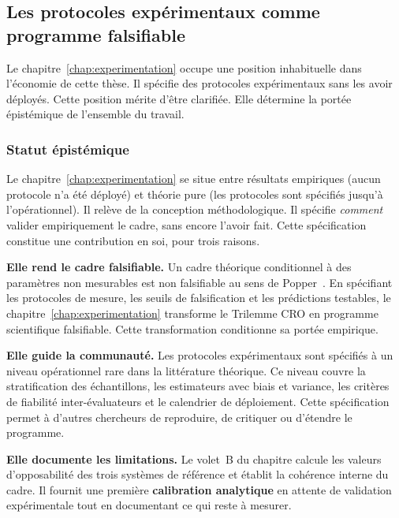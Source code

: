 \subsection{Les protocoles exp\'erimentaux comme programme falsifiable}
\label{subsec:statut_protocoles_experimentaux}
\begin{sloppypar}

Le chapitre~\ref{chap:experimentation} occupe une position
inhabituelle dans l'\'economie de cette th\`ese. Il sp\'ecifie des
protocoles exp\'erimentaux sans les avoir d\'eploy\'es. Cette position
m\'erite d'\^etre clarifi\'ee. Elle d\'etermine la port\'ee
\'epist\'emique de l'ensemble du travail.

\subsubsection{Statut \'epist\'emique}

Le chapitre~\ref{chap:experimentation} se situe entre r\'esultats
empiriques (aucun protocole n'a \'et\'e d\'eploy\'e) et th\'eorie pure (les
protocoles sont sp\'ecifi\'es jusqu'\`a l'op\'erationnel). Il rel\`eve de la
conception m\'ethodologique. Il sp\'ecifie \emph{comment} valider empiriquement
le cadre, sans encore l'avoir fait. Cette sp\'ecification constitue une
contribution en soi, pour trois raisons.

\textbf{Elle rend le cadre falsifiable.} Un cadre th\'eorique
conditionnel \`a des param\`etres non mesurables est non falsifiable au
sens de Popper~\cite{Popper1934}. En sp\'ecifiant les protocoles de
mesure, les seuils de falsification et les pr\'edictions testables, le
chapitre~\ref{chap:experimentation} transforme le Trilemme CRO en
programme scientifique falsifiable. Cette transformation conditionne sa
port\'ee empirique.

\textbf{Elle guide la communaut\'e.} Les protocoles exp\'erimentaux sont
sp\'ecifi\'es \`a un niveau op\'erationnel rare dans la litt\'erature
th\'eorique. Ce niveau couvre la stratification des \'echantillons, les estimateurs avec biais
et variance, les crit\`eres de fiabilit\'e inter-\'evaluateurs et le calendrier de
d\'eploiement. Cette sp\'ecification permet \`a d'autres chercheurs de
reproduire, de critiquer ou d'\'etendre le programme.

\textbf{Elle documente les limitations.} Le volet~B du chapitre calcule
les valeurs d'opposabilit\'e des trois syst\`emes de r\'ef\'erence et
\'etablit la coh\'erence interne du cadre. Il fournit une premi\`ere
\textbf{calibration analytique} en attente de validation
exp\'erimentale tout en documentant ce qui reste \`a mesurer.


\end{sloppypar}

